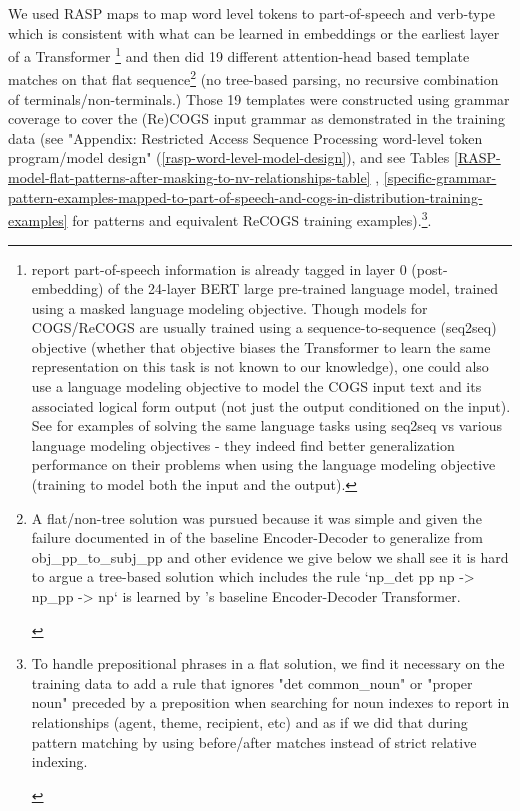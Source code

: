 \documentclass[11pt]{article}
\begin{document}
We used RASP maps to map word level tokens to part-of-speech and verb-type which is consistent with what can be learned in embeddings or the earliest layer of a Transformer \citep{tenney2019bertrediscoversclassicalnlp}\footnote{\citep{tenney2019bertrediscoversclassicalnlp} report part-of-speech information is already tagged in layer 0 (post-embedding) of the 24-layer BERT large pre-trained language model, trained using a masked language modeling objective. Though models for COGS/ReCOGS are usually trained using a sequence-to-sequence (seq2seq) objective (whether that objective biases the Transformer to learn the same representation on this task is not known to our knowledge), one could also use a language modeling objective to model the COGS input text and its associated logical form output (not just the output conditioned on the input). See \citep{10.1162/tacl_a_00733} for examples of solving the same language tasks using seq2seq vs various language modeling objectives - they indeed find better generalization performance on their problems when using the language modeling objective (training to model both the input and the output).} and then did 19 different attention-head based template matches on that flat sequence\footnote{\begin{footnotesize}A flat/non-tree solution was pursued because it was simple and given the failure documented in \citep{Wu2023} of the baseline Encoder-Decoder to generalize from obj\_pp\_to\_subj\_pp and other evidence we give below we shall see it is hard to argue a tree-based solution which includes the rule `np\_det pp np -> np\_pp -> np` is learned by \citep{Wu2023}'s baseline Encoder-Decoder Transformer.\end{footnotesize}} (no tree-based parsing, no recursive combination of terminals/non-terminals.) Those 19 templates were constructed using grammar coverage \citep{fuzzingbook2023:GrammarCoverageFuzzer} to cover the (Re)COGS input grammar as demonstrated in the training data (see "Appendix: Restricted Access Sequence Processing word-level token program/model design" (\ref{rasp-word-level-model-design}), and see Tables \ref{RASP-model-flat-patterns-after-masking-to-nv-relationships-table} , \ref{specific-grammar-pattern-examples-mapped-to-part-of-speech-and-cogs-in-distribution-training-examples} for patterns and equivalent ReCOGS training examples).\footnote{\begin{footnotesize}To handle prepositional phrases in a flat solution, we find it necessary on the training data to add a rule that ignores "det common\_noun" or "proper noun" preceded by a preposition when searching for noun indexes to report in relationships (agent, theme, recipient, etc) and as if we did that during pattern matching by using before/after matches instead of strict relative indexing.\end{footnotesize}}.
\end{document}

